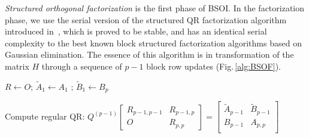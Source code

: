 \documentclass{llncs}
\newcommand{\editDel}[1]{}
\begin{document}
\textit%
{Structured orthogonal factorization} \label{sec:BSOF}
is the first phase of BSOI. 
In the factorization phase, 
we use the serial version of 
the structured QR factorization algorithm introduced 
in~\cite{Wright92BSOF}, 
which is proved to be stable, 
and has an identical serial complexity to the best known 
block structured factorization algorithms based on Gaussian elimination. 
The essence of this algorithm is 
in transformation of the matrix $H$ 
through a sequence of $p-1$ block row updates (Fig.\,\ref{alg:BSOF}). 
\editDel{In the $k$th step, we treat $k$th and $(k+1)$th block rows of $H$.
At first, we perform the QR factorization of 
$2n$ by $n$ submatrix $[\tilde{A}_k^T, B_k^T]^T$ 
using Householder reflectors 
and then we apply the computed Householder reflectors from left 
in the reversed order to the selected non-zero block columns of the rows. }
\begin{algorithm}[t]%
  \footnotesize %
  \BlankLine

  $R \gets O$; $\tilde{A}_1 \gets A_1$ ; $\tilde{B}_1 \gets B_p$\; 
  
  Compute regular QR: 
  $Q^{(p-1)} 
  \begin{bmatrix}
    R_{p-1,p-1} & R_{p-1,p}\\
    O & R_{p,p}
  \end{bmatrix}
  = \begin{bmatrix}
    \tilde{A}_{p-1} & \tilde{B}_{p-1}\\ 
    {B}_{p-1} & {A}_{p,p}\\ 
  \end{bmatrix}$

\end{algorithm}
\end{document}
